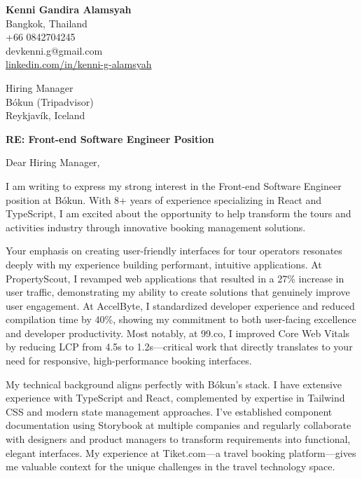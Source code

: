 \documentclass[11pt]{article}
\begin{document}
\begin{flushleft}
\textbf{Kenni Gandira Alamsyah}\\
Bangkok, Thailand\\
+66 0842704245\\
devkenni.g@gmail.com\\
\href{https://www.linkedin.com/in/kenni-g-alamsyah/}{linkedin.com/in/kenni-g-alamsyah}
\end{flushleft}

\vspace{1em}

\begin{flushleft}
Hiring Manager\\
Bókun (Tripadvisor)\\
Reykjavík, Iceland
\end{flushleft}

\vspace{1em}

\textbf{RE: Front-end Software Engineer Position}

\vspace{1em}

Dear Hiring Manager,

I am writing to express my strong interest in the Front-end Software Engineer position at Bókun. With 8+ years of experience specializing in React and TypeScript, I am excited about the opportunity to help transform the tours and activities industry through innovative booking management solutions.

Your emphasis on creating user-friendly interfaces for tour operators resonates deeply with my experience building performant, intuitive applications. At PropertyScout, I revamped web applications that resulted in a 27\% increase in user traffic, demonstrating my ability to create solutions that genuinely improve user engagement. At AccelByte, I standardized developer experience and reduced compilation time by 40\%, showing my commitment to both user-facing excellence and developer productivity. Most notably, at 99.co, I improved Core Web Vitals by reducing LCP from 4.5s to 1.2s—critical work that directly translates to your need for responsive, high-performance booking interfaces.

My technical background aligns perfectly with Bókun's stack. I have extensive experience with TypeScript and React, complemented by expertise in Tailwind CSS and modern state management approaches. I've established component documentation using Storybook at multiple companies and regularly collaborate with designers and product managers to transform requirements into functional, elegant interfaces. My experience at Tiket.com—a travel booking platform—gives me valuable context for the unique challenges in the travel technology space.
\end{document}
